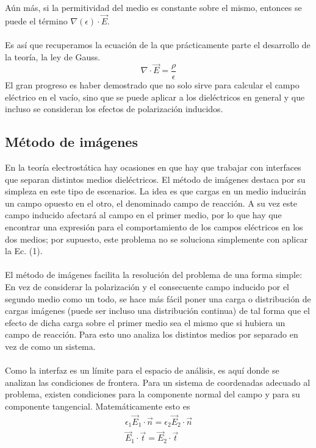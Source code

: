 \documentclass[12pt, notitlepage]{article}
\begin{document}
Aún más, si la permitividad del medio es constante sobre el mismo, entonces se puede el término $\nabla (\epsilon)\cdot\vec{E}$.\\\\
Es así que recuperamos la ecuación de la que prácticamente parte el desarrollo de la teoría, la ley de Gauss.
\begin{equation}
\nabla\cdot\vec{E} = \frac{\rho}{\epsilon}
\end{equation}
El gran progreso es haber demostrado que no solo sirve para calcular el campo eléctrico en el vacío, sino que se puede aplicar a los dieléctricos en general y que incluso se consideran los efectos de polarización inducidos.

\subsection{Método de imágenes}
En la teoría electrostática hay ocasiones en que hay que trabajar con interfaces que separan distintos medios dieléctricos. El método de imágenes destaca por su simpleza en este tipo de escenarios. La idea es que cargas en un medio inducirán un campo opuesto en el otro, el denominado campo de reacción. A su vez este campo inducido afectará al campo en el primer medio, por lo que hay que encontrar una expresión para el comportamiento de los campos eléctricos en los dos medios; por supuesto, este problema no se soluciona simplemente con aplicar la Ec. (1).\\\\
El método de imágenes facilita la resolución del problema de una forma simple: En vez de considerar la polarización y el consecuente campo inducido por el segundo medio como un todo, se hace más fácil poner una carga o distribución de cargas imágenes (puede ser incluso una distribución continua) de tal forma que el efecto de dicha carga sobre el primer medio sea el mismo que si hubiera un campo de reacción. Para esto uno analiza los distintos medios por separado en vez de como un sistema.\\\\
Como la interfaz es un límite para el espacio de análisis, es aquí donde se analizan las condiciones de frontera. Para un sistema de coordenadas adecuado al problema, existen condiciones para la componente normal del campo y para su componente tangencial. Matemáticamente esto es
\begin{gather}
\epsilon_1\vec{E}_1\cdot\vec{n} = \epsilon_2\vec{E}_2\cdot\vec{n}\\
\vec{E}_1\cdot\vec{t} = \vec{E}_2\cdot\vec{t}
\end{gather}
\end{document}
